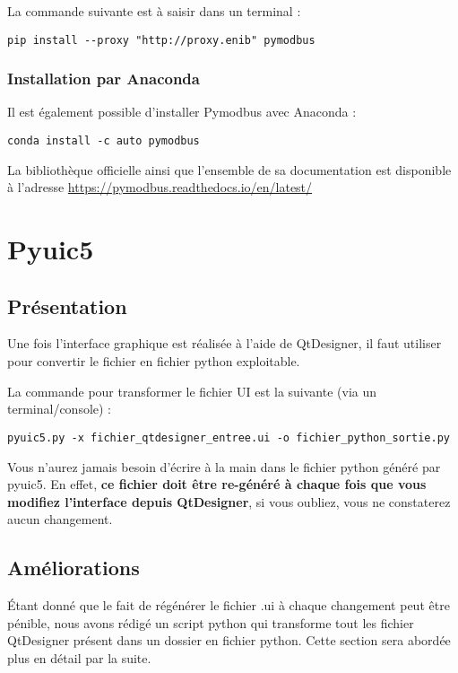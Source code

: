 {La commande suivante est à saisir dans un terminal :
\begin{lstlisting}
pip install --proxy "http://proxy.enib" pymodbus
\end{lstlisting}

\subsubsection{Installation par Anaconda}
 Il est également possible d'installer Pymodbus avec Anaconda : 
\begin{lstlisting}
conda install -c auto pymodbus
\end{lstlisting}

La bibliothèque officielle ainsi que l'ensemble de sa documentation est disponible à l'adresse \url{https://pymodbus.readthedocs.io/en/latest/} \newline 

\section{Pyuic5}

\subsection{Présentation}

Une fois l'interface graphique est réalisée à l'aide de QtDesigner, il faut utiliser  pour convertir le fichier  en fichier python exploitable.\newline

La commande pour transformer le fichier UI est la suivante (via un terminal/console) :
\begin{lstlisting}
pyuic5.py -x fichier_qtdesigner_entree.ui -o fichier_python_sortie.py
\end{lstlisting}

Vous n'aurez jamais besoin d'écrire à la main dans le fichier python généré par pyuic5. En effet, \textbf{ce fichier doit être re-généré à chaque fois que vous modifiez l'interface depuis QtDesigner}, si vous oubliez,  vous ne constaterez aucun changement.

\subsection{Améliorations}

Étant donné que le fait de régénérer le fichier .ui à chaque changement peut être pénible, nous avons rédigé un script python qui transforme tout les fichier QtDesigner présent dans un dossier en fichier python. \newline
Cette section sera abordée plus en détail par la suite.

}

